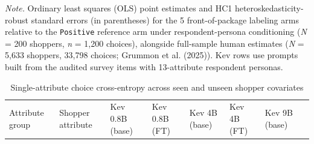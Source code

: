 \documentclass[
  11pt,
  letterpaper,
]{article}
\makeatletter
\newcommand\table@defaultsize{\footnotesize}
\let\table@size\table@defaultsize
\newcommand\nexttablesize[1]{\gdef\table@size{#1}}
\makeatother
\begin{document}
\emph{Note.} Ordinary least squares (OLS) point estimates and HC1
heteroskedasticity-robust standard errors (in parentheses) for the 5
front-of-package labeling arms relative to the \texttt{Positive}
reference arm under respondent-persona conditioning (\emph{N} = 200
shoppers, \emph{n} = 1,200 choices), alongside full-sample human
estimates (\emph{N} = 5,633 shoppers, 33,798 choices; Grummon et al.
(2025)). Kev rows use prompts built from the audited survey items with
13-attribute respondent personas.

\nexttablesize{\scriptsize}
{\def\LTcaptype{apptbl}
\begin{longtable}[]{@{}
  >{\raggedright\arraybackslash}p{}
  >{\raggedright\arraybackslash}p{}
  >{\raggedleft\arraybackslash}p{}
  >{\raggedleft\arraybackslash}p{}
  >{\raggedleft\arraybackslash}p{}
  >{\raggedleft\arraybackslash}p{}
  >{\raggedleft\arraybackslash}p{}
  >{\raggedleft\arraybackslash}p{}@{}}
\caption{{\label{apptbl-grummon2025-personas}}Single-attribute choice
cross-entropy across seen and unseen shopper covariates}\tabularnewline
\toprule\noalign{}
\begin{minipage}[b]{\linewidth}\raggedright
Attribute group
\end{minipage} & \begin{minipage}[b]{\linewidth}\raggedright
Shopper attribute
\end{minipage} & \begin{minipage}[b]{\linewidth}\raggedleft
Kev 0.8B (base)
\end{minipage} & \begin{minipage}[b]{\linewidth}\raggedleft
Kev 0.8B (FT)
\end{minipage} & \begin{minipage}[b]{\linewidth}\raggedleft
Kev 4B (base)
\end{minipage} & \begin{minipage}[b]{\linewidth}\raggedleft
Kev 4B (FT)
\end{minipage} & \begin{minipage}[b]{\linewidth}\raggedleft
Kev 9B (base)
\end{minipage} & \begin{minipage}[b]{\linewidth}\raggedleft

\end{minipage}
\end{longtable}}
\end{document}
